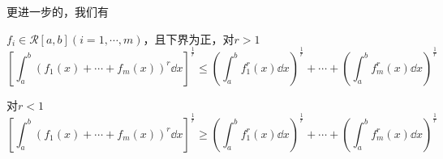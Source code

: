 更进一步的，我们有
\begin{corollary}
	$f_i\in \mathcal{R}[a,b](i=1,\cdots,m)$，且下界为正，对$r>1$
	\[  \left[\int_{a}^{b}(f_1(x)+\cdots+f_m(x))^r\dd x\right]^{\frac{1}{r}}\leqslant (\int_{a}^{b}f_1^r(x)\dd x)^{\frac{1}{r}}+\cdots+(\int_{a}^{b}f_m^r(x)\dd x)^{\frac{1}{r}}  \]
	
	对$r<1$
	\[  \left[\int_{a}^{b}(f_1(x)+\cdots+f_m(x))^r\dd x\right]^{\frac{1}{r}}\geqslant (\int_{a}^{b}f_1^r(x)\dd x)^{\frac{1}{r}}+\cdots+(\int_{a}^{b}f_m^r(x)\dd x)^{\frac{1}{r}}  \]

\end{corollary}
